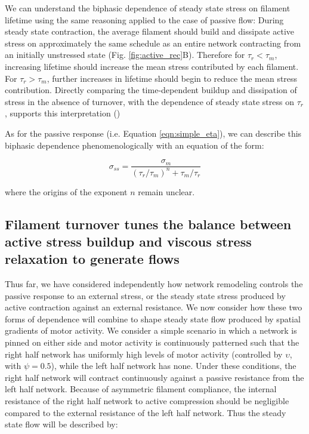 We can understand the biphasic dependence of steady state stress on filament lifetime using the same reasoning applied to the case of passive flow:   During steady state contraction, the average filament should build and dissipate active stress on approximately the same schedule as an entire network contracting from an initially unstressed state (Fig. \ref{fig:active_rec}B). Therefore for $\tau_r < \tau_m$, increasing lifetime should increase the mean stress contributed by each filament. For $\tau_r > \tau_m$, further increases in lifetime should begin to reduce the mean stress contribution. Directly comparing the time-dependent buildup and dissipation of stress in the absence of turnover, with the dependence of steady state stress on $\tau_r$, supports this interpretation ()  


As for the passive response (i.e. Equation \ref{eqn:simple_eta}), we can describe this biphasic dependence phenomenologically with an equation of the form:

\begin{equation}
	\label{eqn:simple_sigma}
	\sigma_{ss} = \frac{\sigma_m}{(\tau_r/\tau_m)^n+\tau_m/\tau_r}  
\end{equation}

where the origins of the exponent $n$ remain unclear.




\subsection*{Filament turnover tunes the balance between active stress buildup and viscous stress relaxation to generate flows}

Thus far, we have considered independently how network remodeling controls the passive response to an external stress, or the steady state stress produced by active contraction against an external resistance. We now consider how these two forms of dependence will combine to shape steady state flow produced by spatial gradients of motor activity. We consider a simple scenario in which a network is pinned on either side and motor activity is continuously patterned such that the right half network has uniformly high levels of motor activity (controlled by $\upsilon$, with $\psi = 0.5$), while the left half network has none. Under these conditions, the right half network will contract continuously against a passive resistance from the left half network.  Because of asymmetric filament compliance, the internal resistance of the right half network to active compression should be negligible compared to the external resistance of the left half network.  Thus the steady state flow will be described by:

